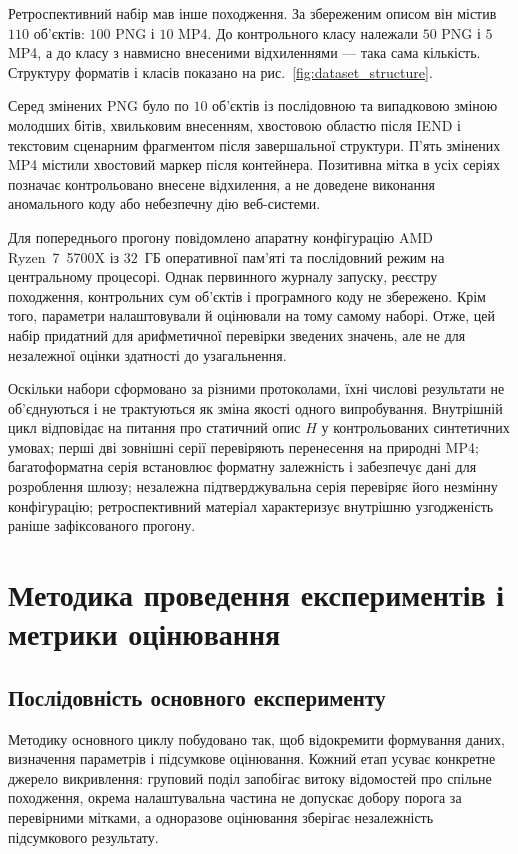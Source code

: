 Ретроспективний набір мав інше походження. За збереженим описом він містив $110$ об’єктів: $100$ PNG і $10$ MP4. До контрольного класу належали $50$ PNG і $5$ MP4, а до класу з навмисно внесеними відхиленнями --- така сама кількість. Структуру форматів і класів показано на рис.~\ref{fig:dataset_structure}.



Серед змінених PNG було по $10$ об’єктів із послідовною та випадковою зміною молодших бітів, хвильковим внесенням, хвостовою областю після IEND і текстовим сценарним фрагментом після завершальної структури. П’ять змінених MP4 містили хвостовий маркер після контейнера. Позитивна мітка в усіх серіях позначає контрольовано внесене відхилення, а не доведене виконання аномального коду або небезпечну дію веб-системи.

Для попереднього прогону повідомлено апаратну конфігурацію AMD Ryzen~7~5700X із $32$~ГБ оперативної пам’яті та послідовний режим на центральному процесорі. Однак первинного журналу запуску, реєстру походження, контрольних сум об’єктів і програмного коду не збережено. Крім того, параметри налаштовували й оцінювали на тому самому наборі. Отже, цей набір придатний для арифметичної перевірки зведених значень, але не для незалежної оцінки здатності до узагальнення.

Оскільки набори сформовано за різними протоколами, їхні числові результати не об’єднуються і не трактуються як зміна якості одного випробування. Внутрішній цикл відповідає на питання про статичний опис $H$ у контрольованих синтетичних умовах; перші дві зовнішні серії перевіряють перенесення на природні MP4; багатоформатна серія встановлює форматну залежність і забезпечує дані для розроблення шлюзу; незалежна підтверджувальна серія перевіряє його незмінну конфігурацію; ретроспективний матеріал характеризує внутрішню узгодженість раніше зафіксованого прогону.

\section{Методика проведення експериментів і метрики оцінювання}

\subsection{Послідовність основного експерименту}

Методику основного циклу побудовано так, щоб відокремити формування даних, визначення параметрів і підсумкове оцінювання. Кожний етап усуває конкретне джерело викривлення: груповий поділ запобігає витоку відомостей про спільне походження, окрема налаштувальна частина не допускає добору порога за перевірними мітками, а одноразове оцінювання зберігає незалежність підсумкового результату.

